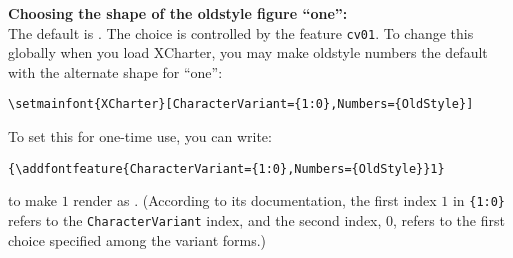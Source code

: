 \documentclass[11pt]{article}
\begin{document}
\noindent \textbf{Choosing the shape of the oldstyle figure ``one'':}\\

The default is . The choice is controlled by the feature \texttt{cv01}. To change this globally when you load XCharter, you may make oldstyle numbers the default with the alternate shape for ``one'':
\begin{verbatim}
\setmainfont{XCharter}[CharacterVariant={1:0},Numbers={OldStyle}]
\end{verbatim}
To set this for one-time use, you can write:
\begin{verbatim}
{\addfontfeature{CharacterVariant={1:0},Numbers={OldStyle}}1}
\end{verbatim}
to make $1$ render as {}. (According to its documentation, the first index $1$ in \verb|{1:0}| refers to the {\tt CharacterVariant} index, and the second index, $0$, refers to the first choice specified among the variant forms.)
\end{document}
